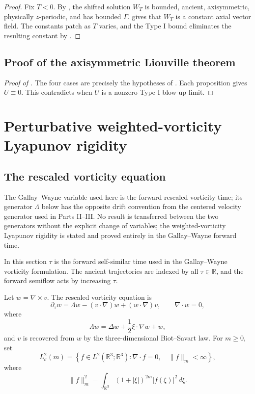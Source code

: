 \documentclass[11pt]{amsart}
\theoremstyle{plain}
\theoremstyle{definition}
\theoremstyle{remark}
\numberwithin{equation}{section}
\begin{document}
\begin{proof}
Fix \(T<0\).  By , the shifted solution \(W_T\) is
bounded, ancient, axisymmetric, physically \(z\)-periodic, and has bounded
\(\Gamma\).   gives that \(W_T\) is a constant axial vector
field.  The constants patch as \(T\) varies, and the Type I bound eliminates
the resulting constant by .
\end{proof}

\subsection{Proof of the axisymmetric Liouville theorem}

\begin{proof}[Proof of ]
The four cases are precisely the hypotheses of
.
Each proposition gives \(U\equiv0\).  This contradicts
 when \(U\) is a nonzero Type I blow-up limit.
\end{proof}

\section{Perturbative weighted-vorticity Lyapunov rigidity}
\label{p3:sec:weighted-vorticity}

\subsection{The rescaled vorticity equation}

The Gallay--Wayne variable used here is the forward rescaled vorticity time;
its generator \(\Lambda\) below has the opposite drift convention from the
centered velocity generator used in Parts II--III.  No result is transferred
between the two generators without the explicit change of variables; the
weighted-vorticity Lyapunov rigidity is stated and proved entirely in the
Gallay--Wayne forward time.

In this section \(\tau\) is the forward self-similar time used in the
Gallay--Wayne vorticity formulation.  The ancient trajectories are indexed by
all \(\tau\in\mathbb R\), and the forward semiflow acts by increasing
\(\tau\).

Let \(w=\nabla\times v\).  The rescaled vorticity equation is
\begin{equation}\label{p3:eq:weighted-vorticity}
   \partial_\tau w
   =
   \Lambda w-(v\cdot\nabla)w+(w\cdot\nabla)v,
   \qquad \nabla\cdot w=0,
\end{equation}
where
\begin{equation}\label{p3:eq:lambda}
   \Lambda w=\Delta w+\frac12\xi\cdot\nabla w+w,
\end{equation}
and \(v\) is recovered from \(w\) by the three-dimensional Biot--Savart law.
For \(m\ge0\), set
\[
   L^2_\sigma(m)
   =
   \left\{
      f\in L^2(\mathbb R^3;\mathbb R^3):
      \nabla\cdot f=0,\quad \|f\|_m<\infty
   \right\},
\]
where
\[
   \|f\|_m^2
   =
   \int_{\mathbb R^3}(1+|\xi|)^{2m}|f(\xi)|^2\,d\xi .
\]
\end{document}
